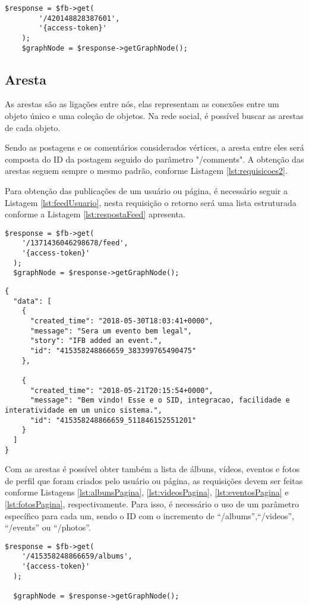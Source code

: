 \begin{lstlisting}[caption={Requisitar uma álbum específico},label={lst:album}]
	$response = $fb->get(
		'/420148828387601',
		'{access-token}'
	);
	$graphNode = $response->getGraphNode();
\end{lstlisting}

\subsection{Aresta}
As arestas são as ligações entre nós, elas representam as conexões entre um objeto único e uma coleção de objetos. Na rede social, é possível buscar as arestas de cada objeto.

Sendo as postagens e os comentários considerados vértices, a aresta entre eles será composta do ID da postagem seguido do parâmetro "/comments". A obtenção das arestas seguem sempre o mesmo padrão, conforme Listagem \ref{lst:requisicoes2}.

Para obtenção das publicações de um usuário ou página, é necessário seguir a Listagem \ref{lst:feedUsuario}, nesta requisição o retorno será uma lista estruturada conforme a Listagem \ref{lst:respostaFeed} apresenta.

\begin{lstlisting}[caption={Requisitando todas as publicações de um usuário},label={lst:feedUsuario},float]
  $response = $fb->get( 
    '/1371436046298678/feed', 
    '{access-token}'
  );
  $graphNode = $response->getGraphNode();
\end{lstlisting}

\begin{lstlisting}[caption={Resposta da requisição \ref{lst:feedUsuario}},label={lst:respostaFeed},float]
{
  "data": [
    {
      "created_time": "2018-05-30T18:03:41+0000",
      "message": "Sera um evento bem legal",
      "story": "IFB added an event.",
      "id": "415358248866659_383399765490475"
    },
    
    {
      "created_time": "2018-05-21T20:15:54+0000",
      "message": "Bem vindo! Esse e o SID, integracao, facilidade e interatividade em um unico sistema.",
      "id": "415358248866659_511846152551201"
    }
  ]
}
\end{lstlisting}

Com as arestas é possível obter também a lista de álbuns, vídeos, eventos e fotos de perfil que foram criados pelo usuário ou página, as requisições devem ser feitas conforme Listagens \ref{lst:albunsPagina}, \ref{lst:videosPagina}, \ref{lst:eventosPagina} e \ref{lst:fotosPagina}, respectivamente. Para isso, é necessário o uso de um parâmetro específico para cada um, sendo o ID com o incremento de ``/albums'',``/videos'', ``/events'' ou ``/photos''.
\begin{lstlisting}[caption={Requisitar todos os álbuns de uma página},label={lst:albunsPagina},float]
  $response = $fb->get( 
    '/415358248866659/albums', 
    '{access-token}'
  );
  
  $graphNode = $response->getGraphNode();
\end{lstlisting}

